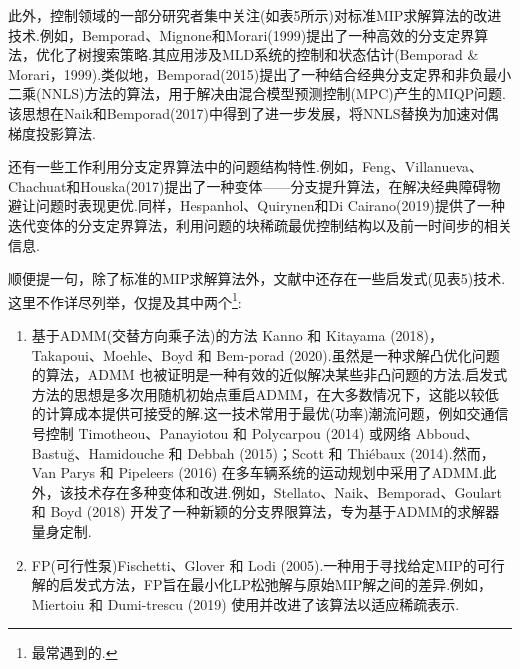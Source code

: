 \documentclass[10pt]{article}
\begin{document}
此外，控制领域的一部分研究者集中关注(如表5所示)对标准MIP求解算法的改进技术.例如，Bemporad、Mignone和Morari(1999)提出了一种高效的分支定界算法，优化了树搜索策略.其应用涉及MLD系统的控制和状态估计(Bemporad \& Morari，1999).类似地，Bemporad(2015)提出了一种结合经典分支定界和非负最小二乘(NNLS)方法的算法，用于解决由混合模型预测控制(MPC)产生的MIQP问题.该思想在Naik和Bemporad(2017)中得到了进一步发展，将NNLS替换为加速对偶梯度投影算法.

还有一些工作利用分支定界算法中的问题结构特性.例如，Feng、Villanueva、Chachuat和Houska(2017)提出了一种变体——分支提升算法，在解决经典障碍物避让问题时表现更优.同样，Hespanhol、Quirynen和Di Cairano(2019)提供了一种迭代变体的分支定界算法，利用问题的块稀疏最优控制结构以及前一时间步的相关信息.

顺便提一句，除了标准的MIP求解算法外，文献中还存在一些启发式(见表5)技术.这里不作详尽列举，仅提及其中两个\footnote{最常遇到的.}:


\begin{table}[h]
  \centering
  \caption{用于MIP求解的替代和启发式技术.}
\end{table}

\begin{enumerate}[label=\roman*)]
  \item 基于ADMM(交替方向乘子法)的方法 Kanno 和 Kitayama (2018)，Takapoui、Moehle、Boyd 和 Bem-porad (2020).虽然是一种求解凸优化问题的算法，ADMM 也被证明是一种有效的近似解决某些非凸问题的方法.启发式方法的思想是多次用随机初始点重启ADMM，在大多数情况下，这能以较低的计算成本提供可接受的解.这一技术常用于最优(功率)潮流问题，例如交通信号控制 Timotheou、Panayiotou 和 Polycarpou (2014) 或网络 Abboud、Bastuğ、Hamidouche 和 Debbah (2015)；Scott 和 Thiébaux (2014).然而，Van Parys 和 Pipeleers (2016) 在多车辆系统的运动规划中采用了ADMM.此外，该技术存在多种变体和改进.例如，Stellato、Naik、Bemporad、Goulart 和 Boyd (2018) 开发了一种新颖的分支界限算法，专为基于ADMM的求解器量身定制.
  \item FP(可行性泵)Fischetti、Glover 和 Lodi (2005).一种用于寻找给定MIP的可行解的启发式方法，FP旨在最小化LP松弛解与原始MIP解之间的差异.例如，Miertoiu 和 Dumi-trescu (2019) 使用并改进了该算法以适应稀疏表示.
\end{enumerate}
\end{document}
